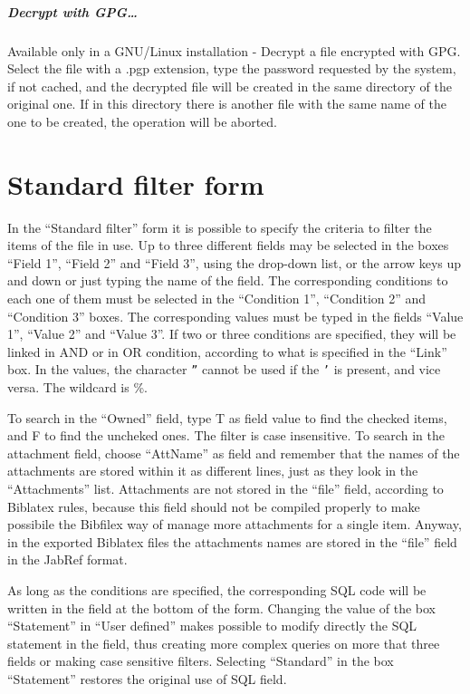 \documentclass[a4paper,12pt]{report}
\begin{document}
\paragraph{Decrypt with GPG\dots} Available only in a GNU/Linux installation - Decrypt a file encrypted with GPG. Select the file with a .pgp extension, type the password requested by the system, if not cached, and the decrypted file will be created in the same directory of the original one. If in this directory there is another file with the same name of the one to be created, the operation will be aborted.

\chapter{Standard filter form}

In the “Standard filter” form it is possible to specify the criteria to filter the items of the file in use. Up to three different fields may be selected in the boxes “Field 1”, “Field 2” and “Field 3”, using the drop-down list, or the arrow keys up and down or just typing the name of the field. The corresponding conditions to each one of them must be selected in the “Condition 1”, “Condition 2” and “Condition 3” boxes. The corresponding values must be typed in the fields “Value 1”, “Value 2” and “Value 3”. If two or three conditions are specified, they will be linked in AND or in OR condition, according to what is specified in the “Link” box. In the values, the character \texttt{''} cannot be used if the \texttt{'} is present, and vice versa. The wildcard is \%.

To search in the “Owned” field, type T as field value to find the checked items, and F to find the uncheked ones. The filter is case insensitive. To search in the attachment field, choose “AttName” as field and remember that the names of the attachments are stored within it as different lines, just as they look in the “Attachments” list. Attachments are not stored in the “file” field, according to Biblatex rules, because this field should not be compiled properly to make possibile the Bibfilex way of manage more attachments for a single item. Anyway, in the exported Biblatex files the attachments names are stored in the “file” field in the JabRef format.

As long as the conditions are specified, the corresponding SQL code will be written in the field at the bottom of the form. Changing the value of the box “Statement” in “User defined” makes possible to modify directly the SQL statement in the field, thus creating more complex queries on more that three fields or making case sensitive filters. Selecting “Standard” in the box “Statement” restores the original use of SQL field.
\end{document}
